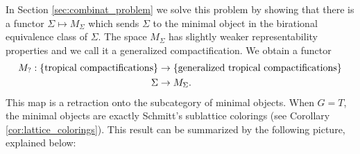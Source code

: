 \documentclass[11pt]{amsart}
\theoremstyle{definition}
\theoremstyle{remark}
\begin{document}
In Section \ref{sec:combinat_problem} we solve this problem by showing that there is a functor $\Sigma\mapsto M_{\Sigma}$ which sends $\Sigma$ to
the minimal object in the birational equivalence class of $\Sigma$. The space $M_{\Sigma}$ has slightly weaker representability
properties and we call it a generalized compactification.
We obtain a functor
\begin{align*}
	M_{?}: \{\textup{tropical compactifications}\}&\to \{\textup{generalized tropical compactifications}\}\\
	\Sigma &\to M_{\Sigma}.
\end{align*}
This map is a retraction onto the subcategory of minimal objects. When $G=T$, the minimal objects are exactly Schmitt's sublattice colorings (see Corollary \ref{cor:lattice_colorings}). This result can be summarized by the following picture, explained below:
\end{document}
